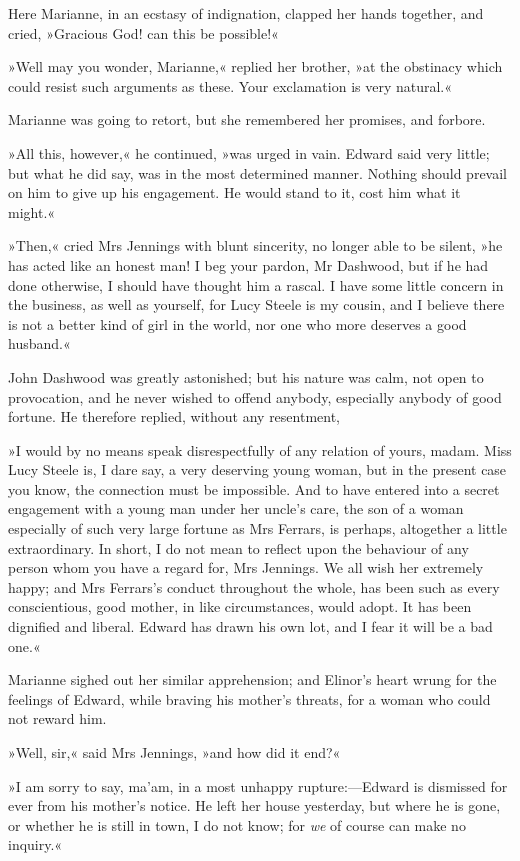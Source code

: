 Here Marianne, in an ecstasy of indignation, clapped her hands together, and cried, »Gracious God! can this be possible!«

»Well may you wonder, Marianne,« replied her brother, »at the obstinacy which could resist such arguments as these. Your exclamation is very natural.«

Marianne was going to retort, but she remembered her promises, and forbore.

»All this, however,« he continued, »was urged in vain. Edward said very little; but what he did say, was in the most determined manner. Nothing should prevail on him to give up his engagement. He would stand to it, cost him what it might.«

»Then,« cried Mrs Jennings with blunt sincerity, no longer able to be silent, »he has acted like an honest man! I beg your pardon, Mr Dashwood, but if he had done otherwise, I should have thought him a rascal. I have some little concern in the business, as well as yourself, for Lucy Steele is my cousin, and I believe there is not a better kind of girl in the world, nor one who more deserves a good husband.«

John Dashwood was greatly astonished; but his nature was calm, not open to provocation, and he never wished to offend anybody, especially anybody of good fortune. He therefore replied, without any resentment,

»I would by no means speak disrespectfully of any relation of yours, madam. Miss Lucy Steele is, I dare say, a very deserving young woman, but in the present case you know, the connection must be impossible. And to have entered into a secret engagement with a young man under her uncle’s care, the son of a woman especially of such very large fortune as Mrs Ferrars, is perhaps, altogether a little extraordinary. In short, I do not mean to reflect upon the behaviour of any person whom you have a regard for, Mrs Jennings. We all wish her extremely happy; and Mrs Ferrars’s conduct throughout the whole, has been such as every conscientious, good mother, in like circumstances, would adopt. It has been dignified and liberal. Edward has drawn his own lot, and I fear it will be a bad one.«

Marianne sighed out her similar apprehension; and Elinor’s heart wrung for the feelings of Edward, while braving his mother’s threats, for a woman who could not reward him.

»Well, sir,« said Mrs Jennings, »and how did it end?«

»I am sorry to say, ma’am, in a most unhappy rupture:—Edward is dismissed for ever from his mother’s notice. He left her house yesterday, but where he is gone, or whether he is still in town, I do not know; for \textit{we} of course can make no inquiry.«

